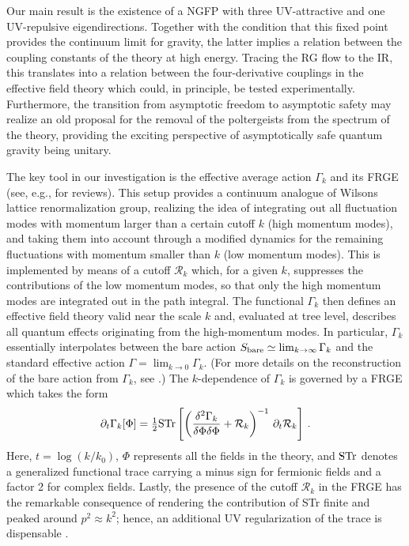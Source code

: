 \documentclass[11pt,reqno]{article}
\newcommand{\be}{\begin{equation}}
\newcommand{\ee}{\end{equation}}
\newcommand{\cR}{\mathcal{R}}
\newcommand{\2}{\sqrt{2\,}}
\newcommand{\half}{\tfrac{1}{2}}
\newcommand{\p}{\partial}
\begin{document}
Our main result is the existence of a NGFP with three UV-attractive and one UV-repulsive 
eigendirections. Together with the condition that this fixed point provides the continuum limit for gravity, the latter implies
a relation between the coupling constants of the theory at high energy. Tracing the RG flow to the IR, this translates into a relation between the four-derivative couplings in the effective field theory which could, in principle, be tested experimentally. Furthermore, the transition from asymptotic freedom to asymptotic safety may realize an old
proposal \cite{Julve:1978xn,Salam:1978fd} for the removal of the poltergeists from the spectrum of the theory, providing the exciting
perspective of asymptotically safe quantum gravity being unitary.

The key tool in our investigation is the effective average action $\Gamma_k$ and its FRGE \cite{Wetterich:1992yh} (see, e.g., \cite{Berges:2000ew,Niedermaier,Percacci:2007sz} for reviews). This setup provides a continuum analogue of Wilsons lattice renormalization group, realizing the idea of integrating out all fluctuation modes with momentum larger than a certain cutoff $k$ (high momentum modes), and taking them into account through a modified dynamics for the remaining fluctuations with momentum smaller than $k$ (low momentum modes). This is implemented by means of a cutoff $\cR_k$ which, for a given $k$, suppresses the contributions of the low momentum modes, so that only the high momentum modes are integrated out in the path integral. The functional $\Gamma_k$ then defines an effective field theory valid near the scale $k$ and, evaluated at tree level, describes all quantum effects originating from the high-momentum modes. In particular, $\Gamma_k$ essentially interpolates between the bare action $S_{\rm bare} \simeq
 \lim_{k \rightarrow \infty} \Gamma_k$ and the standard effective action $\Gamma = \lim_{k \rightarrow 0} \Gamma_k$. (For more details on the reconstruction of the bare action from $\Gamma_k$, see \cite{Manrique:2008zw}.)
The $k$-dependence of $\Gamma_k$ is governed by a FRGE which takes the form \cite{Reuter:1996cp}
%
\be\label{FRGE}
\p_t \Gamma_k[\Phi] = \half {\rm STr} \left[ \left( \frac{\delta^{2} \Gamma_k}{\delta \Phi \delta \Phi } + \cR_k \right)^{-1} \, \p_t \cR_k  \right]\, .
\ee 
Here, $t = \log(k/k_0)$, $\Phi$ represents all the fields in the theory, and $\rm STr$ denotes a generalized functional trace carrying a minus 
sign for fermionic fields and a factor 2 for complex fields.  
Lastly, the presence of the cutoff $\cR_k$ in the FRGE has the remarkable consequence of rendering the contribution of STr finite and peaked around $p^2 \approx k^2$; hence, an additional UV regularization of the trace is dispensable \cite{Niedermaier,Percacci:2007sz,Manrique:2008zw}.
\end{document}
